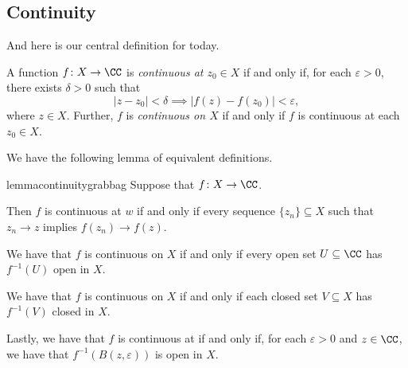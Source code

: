 \documentclass[../notes.tex]{subfiles}
\begin{document}
\subsection{Continuity}
And here is our central definition for today.
\begin{definition}[Continuous]
	A function $f\colon X\to\CC$ is \textit{continuous at $z_0\in X$} if and only if, for each $\varepsilon>0$, there exists $\delta>0$ such that
	\[|z-z_0|<\delta\implies|f(z)-f(z_0)|<\varepsilon,\]
	where $z\in X$. Further, $f$ is \textit{continuous on $X$} if and only if $f$ is continuous at each $z_0\in X$.
\end{definition}
We have the following lemma of equivalent definitions.
\begin{restatable}{lemma}{continuitygrabbag} \label{lem:topologicalcontinuity}
	Suppose that $f\colon X\to\CC$.
	\begin{listalph}
		\item Then $f$ is continuous at $w$ if and only if every sequence $\{z_n\}\subseteq X$ such that $z_n\to z$ implies $f(z_n)\to f(z)$.
		\item We have that $f$ is continuous on $X$ if and only if every open set $U\subseteq\CC$ has $f^{-1}(U)$ open in $X$.
		\item We have that $f$ is continuous on $X$ if and only if each closed set $V\subseteq X$ has $f^{-1}(V)$ closed in $X$.
		\item Lastly, we have that $f$ is continuous at if and only if, for each $\varepsilon>0$ and $z\in\CC$, we have that $f^{-1}(B(z,\varepsilon))$ is open in $X$.
	\end{listalph}
\end{restatable}
\end{document}
